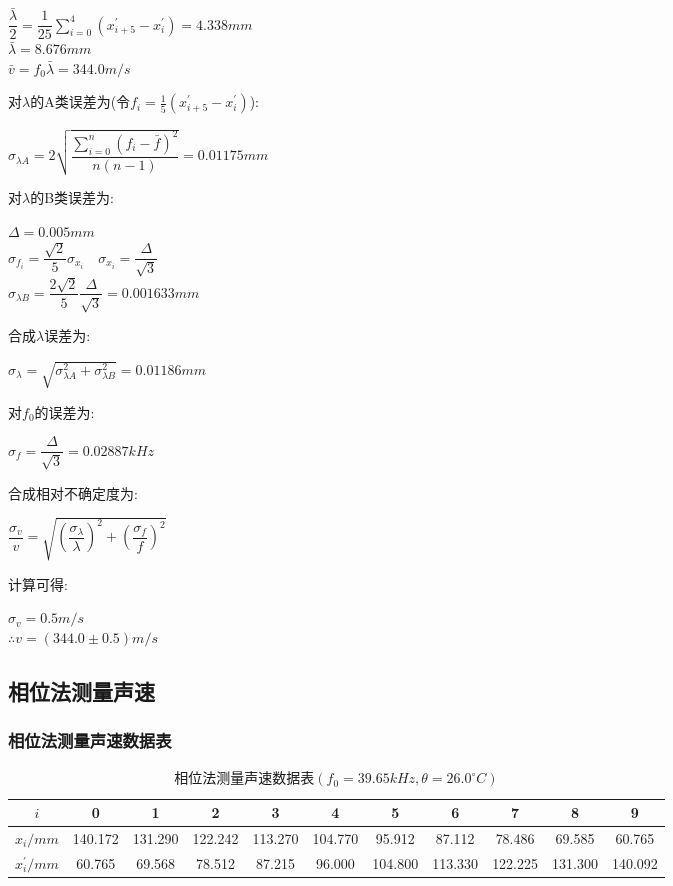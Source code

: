 \documentclass[a4 paper,12pt]{article}
\begin{document}
\begin{center}
	$\dfrac{\bar{\lambda}}{2}=\dfrac{1}{25}\sum\limits_{i=0}^{4}(x_{i+5}^{\prime}-x_{i}^{\prime})=4.338mm$\\
	$\bar{\lambda}=8.676mm$\\
	$\bar{v}=f_{0}\bar{\lambda}=344.0m/s$
\end{center}
对$\lambda$的A类误差为(令$f_{i}=\frac{1}{5}(x_{i+5}^{\prime}-x_{i}^{\prime})$):
\begin{center}
	$\sigma_{\lambda A}=2\sqrt{\dfrac{\sum\limits_{i=0}^{n}(f_{i}-\bar{f})^{2}}{n(n-1)}}=0.01175mm$
\end{center}
对$\lambda$的B类误差为:
\begin{center}
	$\Delta=0.005mm$\\
	$\sigma_{f_{i}}=\dfrac{\sqrt{2}}{5}\sigma_{x_{i}}\quad \sigma_{x_{i}}=\dfrac{\Delta}{\sqrt{3}}$\\
	$\sigma_{\lambda B}=\dfrac{2\sqrt{2}}{5}\dfrac{\Delta}{\sqrt{3}}=0.001633mm$
\end{center}
合成$\lambda$误差为:
\begin{center}
	$\sigma_{\lambda}=\sqrt{\sigma_{\lambda A}^{2}+\sigma_{\lambda B}^{2}}=0.01186mm$
\end{center}
对$f_{0}$的误差为:
\begin{center}
	$\sigma_{f}=\dfrac{\Delta}{\sqrt{3}}=0.02887kHz$
\end{center}
合成相对不确定度为:
\begin{center}
	$\dfrac{\sigma_{v}}{v}=\sqrt{(\dfrac{\sigma_{\lambda}}{\lambda})^{2}+(\dfrac{\sigma_{f}}{f})^{2}}$
\end{center}
计算可得:
\begin{center}
	$\sigma_{v}=0.5m/s$\\
	$\therefore v=(344.0\pm 0.5)m/s$
\end{center}
\subsection{相位法测量声速}
\subsubsection{相位法测量声速数据表}
\begin{table}[H]
	\caption{相位法测量声速数据表$(f_{0}=39.65kHz,\theta=26.0^{\circ}C)$}
	\label{相位法测量声速数据表}
	\centering
	\resizebox{\textwidth}{!}
	{
		\begin{tabular}{*{11}{c}}
			\toprule[0.5mm]
			$i$&0&1&2&3&4&5&6&7&8&9\\
			\midrule
			$x_{i}/mm$&140.172&131.290&122.242&113.270&104.770&95.912&87.112&78.486&69.585&60.765\\
			\midrule
			$x_{i}^{\prime}/mm$&60.765&69.568&78.512&87.215&96.000&104.800&113.330&122.225&131.300&140.092\\
			\bottomrule[0.5mm]
		\end{tabular}
	}
\end{table}
\end{document}
